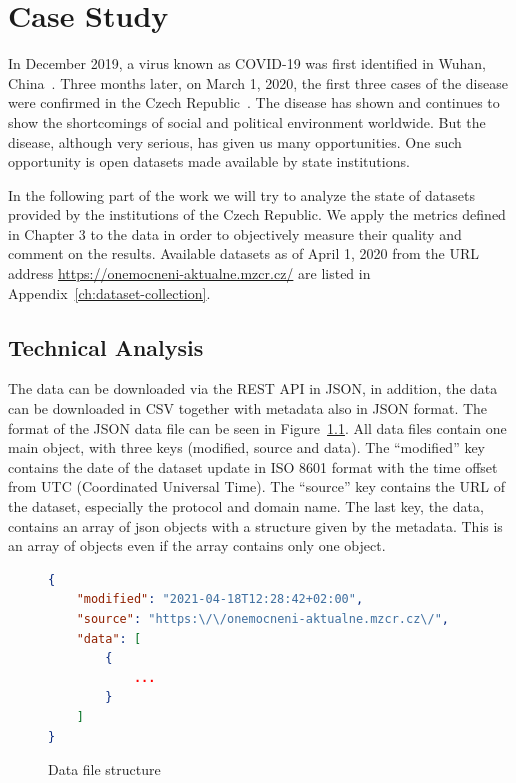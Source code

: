 \newenvironment{QandA}{\begin{enumerate}[label=\bfseries\alph*.]\bfseries}
        {\end{enumerate}}
\newenvironment{answered}{\par\normalfont}{}

\chapter{Case Study}\label{ch:case-study}

In December 2019, a virus known as COVID-19 was first identified in Wuhan, China~\cite{seznam-korona2021}.
Three months later, on March 1, 2020, the first three cases of the disease were confirmed in the Czech Republic~\cite{seznam-korona2021}.
The disease has shown and continues to show the shortcomings of social and political environment worldwide.
But the disease, although very serious, has given us many opportunities.
One such opportunity is open datasets made available by state institutions.

In the following part of the work we will try to analyze the state of datasets provided by the institutions of the Czech Republic.
We apply the metrics defined in Chapter 3 to the data in order to objectively measure their quality and comment on the results.
Available datasets as of April 1, 2020 from the URL address \url{https://onemocneni-aktualne.mzcr.cz/} are listed in Appendix~\ref{ch:dataset-collection}.

\section{Technical Analysis}

The data can be downloaded via the REST API in JSON, in addition, the data can be downloaded in CSV together with metadata also in JSON format.
The format of the JSON data file can be seen in Figure~\ref{ls:data}.
All data files contain one main object, with three keys (modified, source and data).
The \enquote{modified} key contains the date of the dataset update in ISO 8601 format with the time offset from UTC (Coordinated Universal Time).
The \enquote{source} key contains the URL of the dataset, especially the protocol and domain name.
The last key, the data, contains an array of json objects with a structure given by the metadata.
This is an array of objects even if the array contains only one object.

\begin{figure}[htb]
    \centering

    \begin{lstlisting}[language=json,firstnumber=1]
{
    "modified": "2021-04-18T12:28:42+02:00",
    "source": "https:\/\/onemocneni-aktualne.mzcr.cz\/",
    "data": [
        {
            ...
        }
    ]
}
    \end{lstlisting}

    \caption{Data file structure}
    \label{ls:data}
\end{figure}
\FloatBarrier

